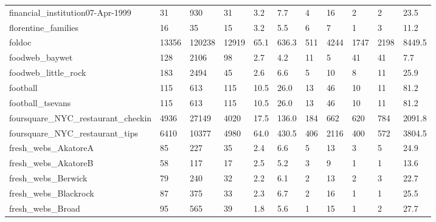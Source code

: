\begin{longtable}{lllllllllll}
 financial\_institution07-Apr-1999                   & 31         & 930       & 31    & 3.2    & 7.7    & 4     & 16     & 2      & 2      & 23.5    \\
 florentine\_families                                & 16         & 35        & 15    & 3.2    & 5.5    & 6     & 7      & 1      & 3      & 11.2    \\
 foldoc                                             & 13356      & 120238    & 12919 & 65.1   & 636.3  & 511   & 4244   & 1747   & 2198   & 8449.5  \\
 foodweb\_baywet                                     & 128        & 2106      & 98    & 2.7    & 4.2    & 11    & 5      & 41     & 41     & 7.7     \\
 foodweb\_little\_rock                                & 183        & 2494      & 45    & 2.6    & 6.6    & 5     & 10     & 8      & 11     & 25.9    \\
 football                                           & 115        & 613       & 115   & 10.5   & 26.0   & 13    & 46     & 10     & 11     & 81.2    \\
 football\_tsevans                                   & 115        & 613       & 115   & 10.5   & 26.0   & 13    & 46     & 10     & 11     & 81.2    \\
 foursquare\_NYC\_restaurant\_checkin                  & 4936       & 27149     & 4020  & 17.5   & 136.0  & 184   & 662    & 620    & 784    & 2091.8  \\
 foursquare\_NYC\_restaurant\_tips                     & 6410       & 10377     & 4980  & 64.0   & 430.5  & 406   & 2116   & 400    & 572    & 3804.5  \\
 fresh\_webs\_AkatoreA                                & 85         & 227       & 35    & 2.4    & 6.6    & 5     & 13     & 3      & 5      & 24.9    \\
 fresh\_webs\_AkatoreB                                & 58         & 117       & 17    & 2.5    & 5.2    & 3     & 9      & 1      & 1      & 13.6    \\
 fresh\_webs\_Berwick                                 & 79         & 240       & 32    & 2.2    & 6.1    & 2     & 13     & 2      & 3      & 22.7    \\
 fresh\_webs\_Blackrock                               & 87         & 375       & 33    & 2.3    & 6.7    & 2     & 16     & 1      & 1      & 25.5    \\
 fresh\_webs\_Broad                                   & 95         & 565       & 39    & 1.8    & 5.6    & 1     & 15     & 1      & 2      & 27.7    \\

\end{longtable}
